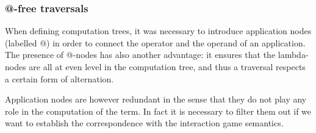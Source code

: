 \subsubsection{@-free traversals}

When defining computation trees, it was necessary to introduce
application nodes (labelled @) in order to connect the operator and
the operand of an application. The presence of @-nodes has also
another advantage: it ensures that the lambda-nodes are all at even
level in the computation tree, and thus a traversal respects a certain form of
alternation.

Application nodes are however redundant in the sense that they do
not play any role in the computation of the term. In fact it is
necessary to filter them out if we want to establish the
correspondence with the interaction game semantics.

